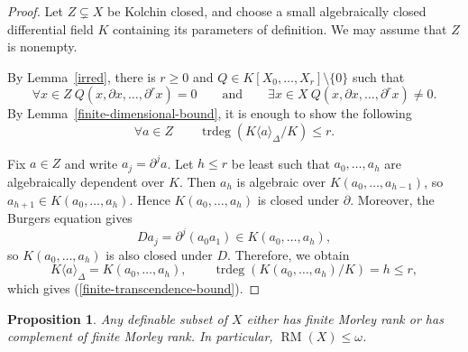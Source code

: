 \documentclass[11pt,a4paper]{amsart}
\newtheorem{proposition}[theorem]{Proposition}
\theoremstyle{definition}
\newcommand{\RM}{\operatorname{RM}}
\newcommand{\trdeg}{\operatorname{trdeg}}
\begin{document}
\begin{proof}
Let $Z\subsetneq X$ be Kolchin closed, and choose a small
algebraically closed differential field $K$ containing
its parameters of definition. We may assume that $Z$ is nonempty.

By Lemma~\ref{irred}, there is $r\geqslant 0$ and $Q\in K[X_0,\ldots,X_r]\setminus \{0\}$ such that
\[
\forall x\in Z \ Q(x,\partial x,\ldots,\partial^r x)=0\qquad \text{and} \qquad \exists x\in X\ Q(x,\partial x,\ldots,\partial^r x)\neq 0.
\]
By Lemma~\ref{finite-dimensional-bound}, it is enough to show the following
\begin{equation}\label{finite-transcendence-bound}
\forall a\in Z\qquad \trdeg(K\langle a\rangle_\Delta/K)\leqslant r.
\tag{$*$}
\end{equation}

Fix $a\in Z$ and write $a_j=\partial^j a$.
Let $h\leqslant r$ be least such that $a_0,\ldots,a_h$
are algebraically dependent over $K$. Then $a_h$ is
algebraic over $K(a_0,\ldots,a_{h-1})$, so $a_{h+1}\in K(a_0,\ldots,a_h)$.
Hence $K(a_0,\ldots,a_h)$ is closed under $\partial$.
Moreover, the Burgers equation gives
\[
Da_j=\partial^j(a_0a_1)\in K(a_0,\ldots,a_h),
\]
so $K(a_0,\ldots,a_h)$ is also closed under $D$. Therefore, we obtain
\[
K\langle a\rangle_\Delta=K(a_0,\ldots,a_h),
\qquad
\trdeg(K(a_0,\ldots,a_h)/K)=h\leqslant r,
\]
which gives (\ref{finite-transcendence-bound}).
\end{proof}

\begin{proposition}\label{upper-bound}
Any definable subset of $X$ either has
finite Morley rank or has complement of finite Morley rank. In particular, $\RM(X)\leqslant\omega$.
\end{proposition}
\end{document}

